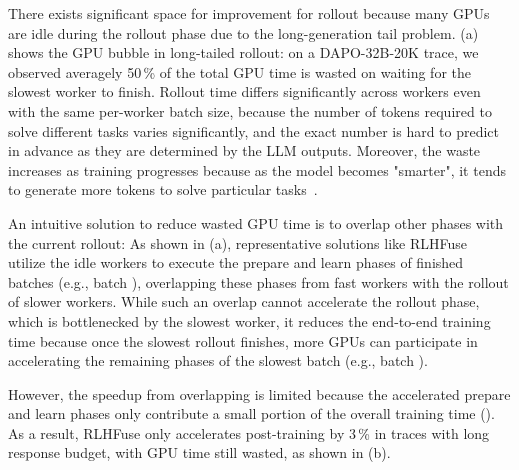 There exists significant space for improvement for rollout 
because many GPUs are idle during the rollout phase due to the long-generation tail problem.
{} (a) shows the GPU bubble in long-tailed rollout:
on a {DAPO-32B-20K} trace, we observed averagely {50\,\%} of the total GPU time is wasted
on waiting for the slowest worker to finish.
Rollout time differs significantly across workers
even with the same per-worker batch size,
because the number of tokens required to solve different tasks varies significantly,
and the exact number is hard to predict in advance as they are determined by the LLM outputs.
Moreover, the waste increases as training progresses because as the model becomes "smarter",
it tends to generate more tokens to solve particular tasks~\cite{deepseek-r1}.

An intuitive solution to reduce wasted GPU time is to overlap other phases with the current rollout:
As shown in { (a)},
representative solutions like RLHFuse~\cite{rlhfuse} utilize the idle workers
to execute the prepare and learn phases of finished batches (e.g., batch ),
overlapping these phases from fast workers with the rollout of slower workers.
While such an overlap cannot accelerate the rollout phase, which is bottlenecked by the slowest worker,
it reduces the end-to-end training time
because once the slowest rollout finishes, more GPUs can participate in accelerating
the remaining phases of the slowest batch (e.g., batch ).

However, the speedup from overlapping is limited
because the accelerated prepare and learn phases only contribute a small portion of the overall training time ().
As a result, RLHFuse only accelerates post-training by {3\,\%} in traces with long response budget,
with GPU time still wasted, as shown in {} (b).


